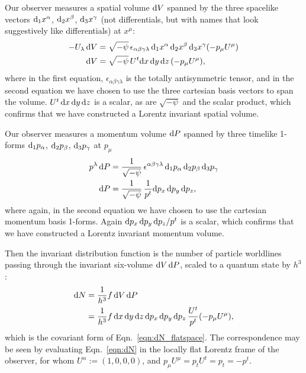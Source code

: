Our observer measures a spatial
volume $\mathrm{d} V$ spanned by the three spacelike vectors
$\mathrm{d}_1x^\alpha$, $\mathrm{d}_2x^\beta$, $\mathrm{d}_3x^\gamma$
(not differentials, but with names that look suggestively like differentials)
at $x^\mu$:
\begin{align}
  \label{eqn:covariant_dV}
  -U_\lambda\,\mathrm{d} V &= \sqrt{-\psi} \, \epsilon_{\alpha\beta\gamma\lambda}\,
  \mathrm{d}_1x^\alpha\, \mathrm{d}_2x^\beta\, \mathrm{d}_3x^\gamma (-p_\mu U^\mu) \\
  \label{eqn:dV}
  \mathrm{d} V       &= \sqrt{-\psi} \, U^t \mathrm{d} x\,\mathrm{d} y\,\mathrm{d} z\, (-p_\mu U^\mu),
\end{align}
where in the first equation, $\epsilon_{\alpha\beta\gamma\lambda}$ is the
totally antisymmetric tensor, and in the second equation we have
chosen to use the three cartesian basis vectors to span the volume.
$U^t \,\mathrm{d} x\,\mathrm{d} y\,\mathrm{d} z$ is a scalar,
as are $\sqrt{-\psi}$ and the scalar product, which confirms that we have
constructed a Lorentz invariant spatial volume.

Our observer
measures a momentum volume $\mathrm{d} P$ spanned by three timelike 1-forms
$\mathrm{d}_1p_\alpha$, $\mathrm{d}_2p_\beta$, $\mathrm{d}_3p_\gamma$ at $p_\mu$
\begin{align}
  \label{eqn:covariant_dP}
  p^\lambda\, \mathrm{d} P &= \frac{1}{\sqrt{-\psi}} \, \epsilon^{\alpha\beta\gamma\lambda}\,
  \mathrm{d}_1p_\alpha\, \mathrm{d}_2p_\beta\, \mathrm{d}_3p_\gamma \\
  \label{eqn:dP}
  \mathrm{d} P &= \frac{1}{\sqrt{-\psi}} \, \frac{1}{p^t} \mathrm{d} p_x\, \mathrm{d} p_y\, \mathrm{d} p_z,
\end{align}
where again, in the second equation we have chosen to use the cartesian momentum
basis 1-forms.
Again $\mathrm{d} p_x\, \mathrm{d} p_y\, \mathrm{d} p_z/p^t$ is a scalar,
which confirms that we have
constructed a Lorentz invariant momentum volume.

Then the invariant distribution function is the number of particle worldlines
passing through the invariant six-volume $\mathrm{d} V\,\mathrm{d} P$, scaled to a quantum
state by $h^3$:
\begin{align}
  \label{eqn:dN_covariant}
  \mathrm{d} N &= \frac{1}{h^3} f\, \mathrm{d} V \, \mathrm{d} P\\
  \label{eqn:dN}
  &= \frac{1}{h^3} f\,
  \mathrm{d} x\,\mathrm{d} y\,\mathrm{d} z\, \mathrm{d} p_x\, \mathrm{d} p_y\, \mathrm{d} p_z\,
  \frac{U^t}{p^t} (-p_\mu U^\mu),
\end{align}
which is the covariant form of Eqn.~\ref{eqn:dN_flatspace}. The correspondence
may be seen by evaluating Eqn.~\ref{eqn:dN} in the locally flat Lorentz frame of
the observer, for whom $U^\alpha:=(1,0,0,0)$, and
$p_\mu U^\mu=p_tU^t=p_t=-p^t$.

